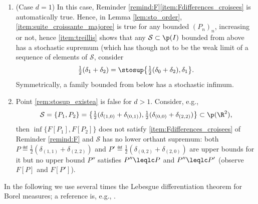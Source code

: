 \skpt
\begin{rem}\label{rem:stosup_existe}
\begin{enumerate}
\item\label{rem:stosup_existea}
(Case $d=1$) In this case, Reminder \ref{remind:F}\eqref{item:Fdifferences_croisees} is automatically true. Hence, in Lemma \ref{lem:sto_order}, \eqref{item:suite_croissante_majoree} is true for any bounded $(P_n)_n$, increasing or not, hence \eqref{item:treillis} shows that any $\mathcal{S}\subset\p(I)$ bounded from above has a stochastic supremum (which has though not to be the weak limit of a sequence of elements of $\mathcal{S}$, consider
\[
\tfrac12(\delta_{1}+\delta_{2})=\stosup\bigl\{\tfrac12(\delta_{0}+\delta_{2}),\delta_{1}\bigr\}.
\]
Symmetrically, a family bounded from below has a stochastic infimum.

\item\label{rem:stosup_existeb}
Point \eqref{rem:stosup_existea} is false for $d>1$. Consider, e.g.,
\[
\mathcal{S}=\{P_1,P_2\}=\bigl\{\tfrac12(\delta_{(1,0)}+\delta_{(0,1)}),\tfrac12(\delta_{(0,0)}+\delta_{(2,2)})\bigr\}\subset\p(\R^2),
\]
then $\inf\{F[P_1],F[P_2]\}$ does not satisfy \eqref{item:Fdifferences_croisees} of Reminder \ref{remind:F} and $\mathcal{S}$ has no lower orthant supremum: both $P\eqdef\frac12(\delta_{(1,1)}+\delta_{(2,2)})$ and $P'\eqdef\frac12(\delta_{(0,2)}+\delta_{(2,0)})$ are upper bounds for it but no upper bound $P''$ satisfies $P''\leqlc P$ and $P''\leqlc P'$ (observe $F[P]$ and $F[P']$).
\end{enumerate}
\end{rem}

\begin{rem}In the following we use several times the Lebesgue differentiation theorem for Borel measures; a reference is, e.g., \cite[\S2.8--2.9]{Fe}.
\end{rem}

